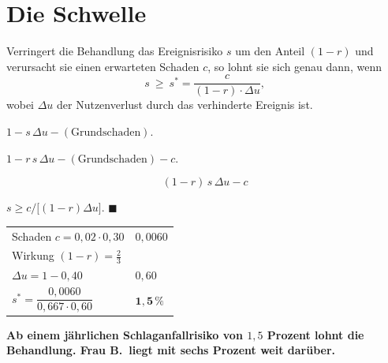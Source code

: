 \section{Die Schwelle}

\begin{merksatz}
Verringert die Behandlung das Ereignisrisiko $s$ um den Anteil $(1-r)$ und verursacht sie einen erwarteten Schaden $c$, so lohnt sie sich genau dann, wenn
\[ s \ \ge\ s^{*} = \frac{c}{(1-r)\cdot\Delta u} , \]
wobei $\Delta u$ der Nutzenverlust durch das verhinderte Ereignis ist.

 $1 - s\,\Delta u - (\text{Grundschaden})$.

 $1 - r\,s\,\Delta u - (\text{Grundschaden}) - c$.

\[ (1-r)\,s\,\Delta u - c \]

 $s \ge c/\bigl[(1-r)\Delta u\bigr]$. $\blacksquare$

\begin{center}
{\small
\renewcommand{\arraystretch}{1.48}
\begin{tabular}{@{}P{3.0cm}P{2.4cm}@{}}
\toprule
Schaden $c = 0{,}02\cdot0{,}30$ & $0{,}0060$\\
Wirkung $(1-r) = \tfrac23$ & \\
$\Delta u = 1 - 0{,}40$ & $0{,}60$\\
\midrule
$s^{*} = \dfrac{0{,}0060}{0{,}667\cdot0{,}60}$ & $\mathbf{1{,}5\,\%}$\\
\bottomrule
\end{tabular}}
\end{center}

\begin{center}
\begin{minipage}{0.9\textwidth}
\textbf{Ab einem jährlichen Schlaganfallrisiko von $1{,}5$ Prozent lohnt die Behandlung. Frau B.\ liegt mit sechs Prozent weit darüber.}
\end{minipage}
\end{center}

\begin{center}
\begin{minipage}{0.88\textwidth}
\end{minipage}
\end{center}
\end{merksatz}

